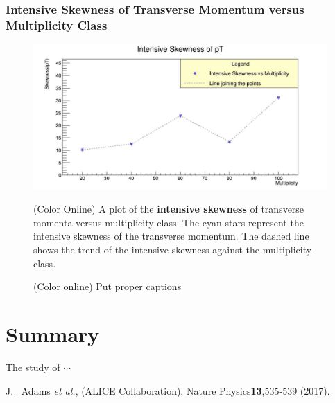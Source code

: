 \documentclass[letterpaper,aps,prc,superscriptaddress,nofootinbib,10pt,showpacs,floatfix]{revtex4-2}%
\begin{document}
\subsubsection{Intensive Skewness of Transverse Momentum versus Multiplicity Class}
\label{subsubsec:intskew}
\vspace{-5mm}
\begin{figure}[!htb]
\begin{minipage}{0.9\textwidth}
   \label{Fig:9}
     \centering
     \renewcommand{\thefigure}{9}
     \includegraphics[width=0.9\linewidth]{intskew}
     \caption{(Color Online) A plot of the \textbf{intensive skewness} of transverse momenta versus multiplicity class. The cyan stars represent the intensive skewness of the transverse momentum. The dashed line shows the trend of the intensive skewness against the multiplicity class.}
\end{minipage}
\end{figure}










\newpage
\begin{figure}
\begin{center}
\caption{(Color online) Put proper captions}
\label{f1}
\end{center}
\end{figure}









\section{Summary}

The study of  $\cdots$


\begin{thebibliography}{50}
\medskip


  
 J. ~Adams {\it et al.}, (ALICE Collaboration), Nature Physics{\bf 13},535-539 (2017). 


\end{thebibliography}
\end{document}
